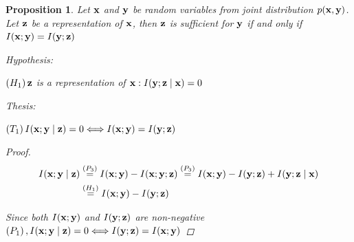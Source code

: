\documentclass{article} %
\theoremstyle{plain}
\newtheorem{theorem}{Theorem}[section]
\newtheorem{proposition}[theorem]{Proposition}
\theoremstyle{definition}
\theoremstyle{remark}
\begin{document}
\begin{proposition}

Let ${\mathbf{x}}$ and ${\mathbf{y}}$ be random variables from joint distribution $p({\mathbf{x}}, {\mathbf{y}})$. Let ${\mathbf{z}}$ be a representation of ${\mathbf{x}}$, then ${\mathbf{z}}$ is sufficient for ${\mathbf{y}}$ if and only if $I({\mathbf{x}} ; {\mathbf{y}})=I({\mathbf{y}} ; {\mathbf{z}})$

Hypothesis:

$\left(H_1\right) {\mathbf{z}}$ is a representation of ${\mathbf{x}}: I({\mathbf{y}} ; {\mathbf{z}} \mid {\mathbf{x}})=0$

Thesis:

$\left(T_1\right) I({\mathbf{x}} ; {\mathbf{y}} \mid {\mathbf{z}})=0 \Longleftrightarrow I({\mathbf{x}} ; {\mathbf{y}})=I({\mathbf{y}} ; {\mathbf{z}})$

\begin{proof}
$$
\begin{aligned}
I({\mathbf{x}} ; {\mathbf{y}} \mid {\mathbf{z}}) & \stackrel{\left(P_3\right)}{=} I({\mathbf{x}} ; {\mathbf{y}})-I({\mathbf{x}} ; {\mathbf{y}} ; {\mathbf{z}}) \stackrel{\left(P_3\right)}{=} I({\mathbf{x}} ; {\mathbf{y}})-I({\mathbf{y}} ; {\mathbf{z}})+I({\mathbf{y}} ; {\mathbf{z}} \mid {\mathbf{x}}) \\
& \stackrel{\left(H_1\right)}{=} I({\mathbf{x}} ; {\mathbf{y}})-I({\mathbf{y}} ; {\mathbf{z}})
\end{aligned}
$$

Since both $I({\mathbf{x}} ; {\mathbf{y}})$ and $I({\mathbf{y}} ; {\mathbf{z}})$ are non-negative $\left(P_1\right), I({\mathbf{x}} ; {\mathbf{y}} \mid {\mathbf{z}})=0 \Longleftrightarrow I({\mathbf{y}} ; {\mathbf{z}})=I({\mathbf{x}} ; {\mathbf{y}})$

\end{proof}
\label{sufficiency}
\end{proposition}





\end{document}
